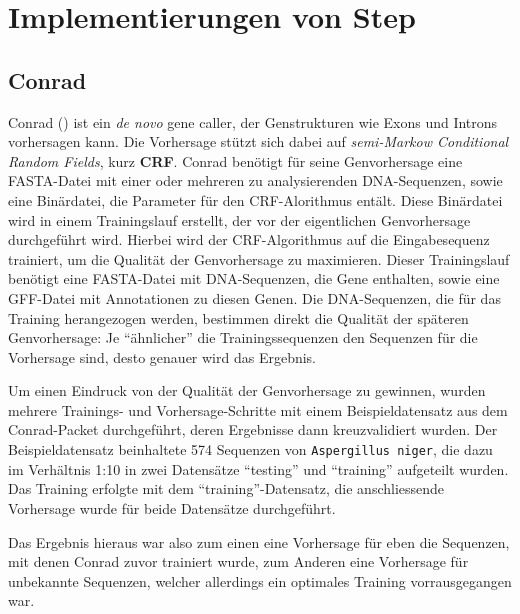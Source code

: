 \section{Implementierungen von Step}
\todo{\dots}
\subsection{Conrad}
Conrad
()
ist ein \textit{de novo} gene caller, der Genstrukturen wie Exons und Introns
vorhersagen kann.
 
Die Vorhersage stützt sich dabei auf \textit{semi-Markow Conditional Random
Fields}, kurz \textbf{CRF}.  %
  
Conrad benötigt für seine Genvorhersage eine FASTA-Datei mit einer oder
mehreren zu analysierenden DNA-Sequenzen, sowie eine Binärdatei, die Parameter
für den CRF-Alorithmus entält.
Diese Binärdatei wird in einem Trainingslauf erstellt, der vor der
eigentlichen Genvorhersage durchgeführt wird. Hierbei wird der CRF-Algorithmus
auf die Eingabesequenz trainiert, um die Qualität der Genvorhersage
zu maximieren. Dieser Trainingslauf benötigt eine FASTA-Datei mit
DNA-Sequenzen, die Gene enthalten, sowie eine GFF-Datei mit Annotationen zu
diesen Genen.
Die DNA-Sequenzen, die für das Training herangezogen werden, bestimmen direkt
die Qualität der späteren Genvorhersage:
Je \enquote{ähnlicher} die Trainingssequenzen den Sequenzen für die
Vorhersage sind, desto genauer wird das Ergebnis.
\citep{doherty_gene_2007}

Um einen Eindruck von der Qualität der Genvorhersage zu gewinnen, wurden
mehrere Trainings- und Vorhersage-Schritte mit einem Beispieldatensatz aus dem
Conrad-Packet durchgeführt, deren Ergebnisse dann kreuzvalidiert wurden.
Der Beispieldatensatz beinhaltete 574 Sequenzen von \texttt{Aspergillus niger},
die dazu im Verhältnis 1:10 in zwei Datensätze \enquote{testing} und
\enquote{training} aufgeteilt wurden. Das Training erfolgte mit dem
\enquote{training}-Datensatz, die anschliessende Vorhersage wurde für beide
Datensätze durchgeführt.

Das Ergebnis hieraus war also zum einen eine Vorhersage für eben die Sequenzen,
mit denen Conrad zuvor trainiert wurde, zum Anderen eine Vorhersage für unbekannte
Sequenzen, welcher allerdings ein optimales Training vorrausgegangen war.

